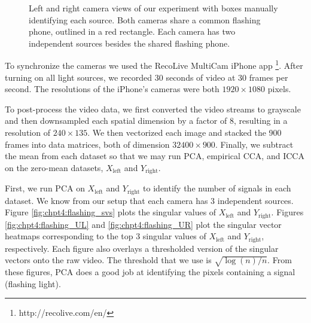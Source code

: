 \begin{figure}
  \begin{center}
    \caption{Left and right camera views of our experiment with boxes manually identifying
      each source. Both cameras share a common flashing phone, outlined in a red
      rectangle. Each camera has two independent sources besides the shared flashing
      phone.}
    \label{fig:chpt4:flashing_sources}
  \end{center}
\end{figure}


To synchronize the cameras we used the RecoLive MultiCam iPhone app
\footnote{http://recolive.com/en/}. After turning on all light sources, we recorded
30 seconds of video at 30 frames per second. The resolutions of the iPhone's cameras were
both $1920\times 1080$ pixels. 

To post-process the video data, we first converted the video streams to grayscale and then
downsampled each spatial dimension by a factor of 8, resulting in a resolution of $240\times
135$. We then vectorized each image and stacked the 900 frames into data matrices, both
of dimension $32400 \times 900$. Finally, we subtract the mean from each dataset so that
we may run PCA, empirical CCA, and ICCA on the zero-mean datasets, $X_{\text{left}}$ and
$Y_{\text{right}}$.

First, we run PCA on $X_{\text{left}}$ and $Y_{\text{right}}$ to identify the number of
signals in each dataset. We know from our setup that each camera has 3
independent sources. Figure \ref{fig:chpt4:flashing_svs} plots the singular values of
$X_{\text{left}}$ and $Y_{\text{right}}$. Figures \ref{fig:chpt4:flashing_UL} and
\ref{fig:chpt4:flashing_UR} plot the singular vector heatmaps corresponding to the top 3
singular values of $X_{\text{left}}$ and $Y_{\text{right}}$, respectively. Each figure
also overlays a thresholded version of the singular vectors onto the raw video. The
threshold that we use is $\sqrt{\log(n)/n}$. From these figures, PCA does a good job at
identifying the pixels containing a signal (flashing light). 

